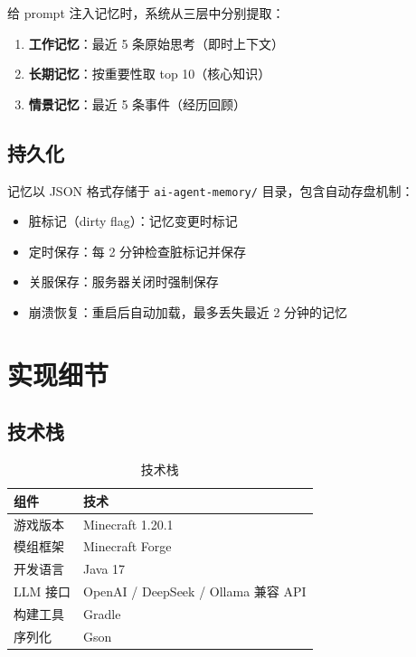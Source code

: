 \documentclass[12pt,a4paper]{article}
\begin{document}
给 prompt 注入记忆时，系统从三层中分别提取：

\begin{enumerate}
    \item \textbf{工作记忆}：最近 5 条原始思考（即时上下文）
    \item \textbf{长期记忆}：按重要性取 top 10（核心知识）
    \item \textbf{情景记忆}：最近 5 条事件（经历回顾）
\end{enumerate}

\subsection{持久化}

记忆以 JSON 格式存储于 \texttt{ai-agent-memory/} 目录，包含自动存盘机制：

\begin{itemize}
    \item 脏标记（dirty flag）：记忆变更时标记
    \item 定时保存：每 2 分钟检查脏标记并保存
    \item 关服保存：服务器关闭时强制保存
    \item 崩溃恢复：重启后自动加载，最多丢失最近 2 分钟的记忆
\end{itemize}

\section{实现细节}

\subsection{技术栈}

\begin{table}[H]
\centering
\caption{技术栈}
\label{tab:techstack}
\begin{tabular}{@{}ll@{}}
\toprule
\textbf{组件} & \textbf{技术} \\
\midrule
游戏版本 & Minecraft 1.20.1 \\
模组框架 & Minecraft Forge \\
开发语言 & Java 17 \\
LLM 接口 & OpenAI / DeepSeek / Ollama 兼容 API \\
构建工具 & Gradle \\
序列化 & Gson \\
\bottomrule
\end{tabular}
\end{table}
\end{document}
